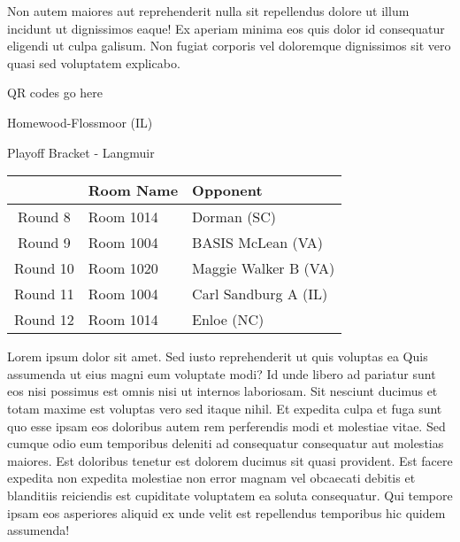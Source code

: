\documentclass{article}%
\begin{document}
\newline%
Non autem maiores aut reprehenderit nulla sit repellendus dolore ut illum incidunt ut dignissimos eaque! Ex aperiam minima eos quis dolor id consequatur eligendi ut culpa galisum. Non fugiat corporis vel doloremque dignissimos sit vero quasi sed voluptatem explicabo.\newline%
\newline%
%
\vspace*{30pt}%
\begin{center}%
\begin{Huge}%
QR codes go here%
\end{Huge}%
\end{center}%
\newpage%
\begin{center}%
\begin{Huge}%
Homewood{-}Flossmoor (IL)%
\end{Huge}%
\vspace*{8pt}%
\linebreak%
\begin{Large}%
Playoff Bracket {-} Langmuir%
\end{Large}%
\end{center}%
\begin{tabularx}{\textwidth}{|c|Y|Y|}%
\hline%
&Room Name&Opponent\\%
\hline%
Round 8&Room 1014&Dorman (SC)\\%
Round 9&Room 1004&BASIS McLean (VA)\\%
Round 10&Room 1020&Maggie Walker B (VA)\\%
Round 11&Room 1004&Carl Sandburg A (IL)\\%
Round 12&Room 1014&Enloe (NC)\\%
\hline%
\end{tabularx}%
\vspace*{8pt}%
\linebreak%
\newline%
\newline%
Lorem ipsum dolor sit amet. Sed iusto reprehenderit ut quis voluptas ea Quis assumenda ut eius magni eum voluptate modi? Id unde libero ad pariatur sunt eos nisi possimus est omnis nisi ut internos laboriosam. Sit nesciunt ducimus et totam maxime est voluptas vero sed itaque nihil. Et expedita culpa et fuga sunt quo esse ipsam eos doloribus autem rem perferendis modi et molestiae vitae.\newline%
\newline%
Sed cumque odio eum temporibus deleniti ad consequatur consequatur aut molestias maiores. Est doloribus tenetur est dolorem ducimus sit quasi provident. Est facere expedita non expedita molestiae non error magnam vel obcaecati debitis et blanditiis reiciendis est cupiditate voluptatem ea soluta consequatur. Qui tempore ipsam eos asperiores aliquid ex unde velit est repellendus temporibus hic quidem assumenda!\newline%
\end{document}
